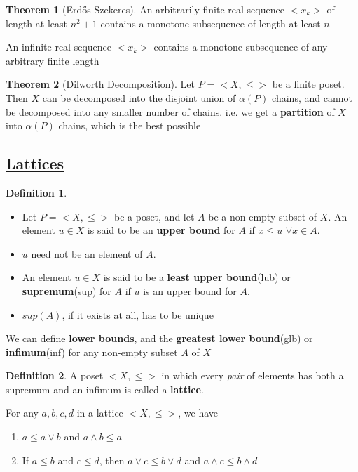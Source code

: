 \documentclass{article}
\theoremstyle{definition}
\newtheorem*{defi}{Definition}
\theoremstyle{definition}
\newenvironment{manualprop}[1]{%
  \renewcommand\themanualpropinner{#1}%
  \manualpropinner
}{\endmanualpropinner}
\newenvironment{manualcoro}[1]{%
  \renewcommand\themanualcoroinner{#1}%
  \manualcoroinner
}{\endmanualcoroinner}
\theoremstyle{named}
\newtheorem*{namedtheorem}{Theorem}
\begin{document}
\begin{namedtheorem}[Erdős-Szekeres] 
An arbitrarily finite real sequence $<x_k>$ of length at least $n^2 + 1$ contains a monotone subsequence of length at least $n$
\end{namedtheorem}

\begin{manualcoro}{1.1}
An infinite real sequence $<x_k>$ contains a monotone subsequence of any arbitrary finite length
\end{manualcoro}

\begin{namedtheorem}[Dilworth Decomposition]
Let $P = <X, \le>$ be a finite poset. Then $X$ can be decomposed into the disjoint union of $\alpha(P)$ chains, and cannot be decomposed into any smaller number of chains. i.e. we get a \textbf{partition} of $X$ into $\alpha(P)$ chains, which is the best possible 
\end{namedtheorem}

\subsection{\underline{Lattices}}

\begin{defi}

\begin{itemize}
\item Let $P = <X, \leq>$ be a poset, and let $A$ be a non-empty subset of $X$. An element $u \in X$ is said to be an \textbf{upper bound} for $A$ if $x \leq u$ $\forall x \in A$.
\item $u$ need not be an element of $A$. 
\item An element $u\in X$ is said to be a \textbf{least upper bound}(lub) or \textbf{supremum}(sup) for $A$ if $u$ is an upper bound for $A$.
\item $sup(A)$, if it exists at all, has to be unique
\end{itemize}
\end{defi}

We can define \textbf{lower bounds}, and the \textbf{greatest lower bound}(glb) or \textbf{infimum}(inf) for any non-empty subset $A$ of $X$ 


\begin{defi}
A poset $<X, \leq>$ in which every \textit{pair} of elements has both a supremum and an infimum is called a \textbf{lattice}. 
\end{defi}

\begin{manualprop}{9}
For any $a,b,c,d$ in a lattice $<X, \leq>$, we have
\begin{enumerate}
\item $a \leq a \vee b $  and $a \wedge b \leq a$
\item If $a \leq b$ and $c \leq d$, then $a \vee c \leq b \vee d $ and $a \wedge c \leq b \wedge d$
\end{enumerate}
\end{manualprop}
\end{document}
